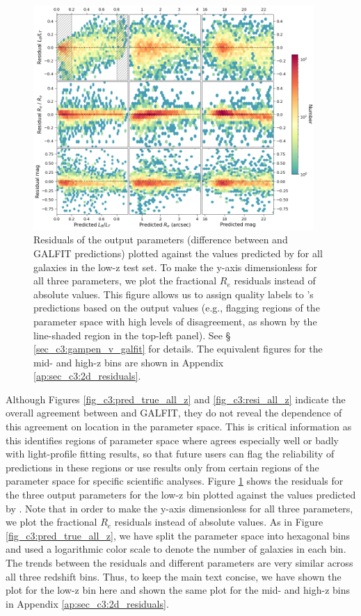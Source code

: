 \begin{figure}[htb]
    \centering
    \includegraphics[width = 0.95\textwidth]{2d_res_low_z.png}
    \caption{Residuals of the output parameters (difference between \gampen{} and GALFIT predictions) plotted against the values predicted by \gampen{} for all galaxies in the low-z test set. To make the y-axis dimensionless for all three parameters, we plot the fractional $R_e$ residuals instead of absolute values. This figure allows us to assign quality labels to \gampen{}'s predictions based on the output values (e.g., flagging regions of the parameter space with high levels of disagreement, as shown by the line-shaded region in the top-left panel). See \S\,\ref{sec_c3:gampen_v_galfit} for details. The equivalent figures for the mid- and high-z bins are shown in Appendix \ref{ap:sec_c3:2d_residuals}.}
    \label{fig_c3:2d_res_low_z}
\end{figure}

Although Figures \ref{fig_c3:pred_true_all_z} and \ref{fig_c3:resi_all_z} indicate the overall agreement between \gampen{} and GALFIT, they do not reveal the dependence of this agreement on location in the parameter space. This is critical information as this identifies regions of parameter space where \gampen{} agrees especially well or badly with light-profile fitting results, so that future users can flag the reliability of predictions in these regions or use results only from certain regions of the parameter space for specific scientific analyses. Figure \ref{fig_c3:2d_res_low_z} shows the residuals for the three output parameters for the low-z bin plotted against the values predicted by \gampen{}. Note that in order to make the y-axis dimensionless for all three parameters, we plot the fractional $R_e$ residuals instead of absolute values. As in Figure \ref{fig_c3:pred_true_all_z},  we have split the parameter space into hexagonal bins and used a logarithmic color scale to denote the number of galaxies in each bin. The trends between the residuals and different parameters are very similar across all three redshift bins. Thus, to keep the main text concise, we have shown the plot for the low-z bin here and shown the same plot for the mid- and high-z bins in Appendix \ref{ap:sec_c3:2d_residuals}.


